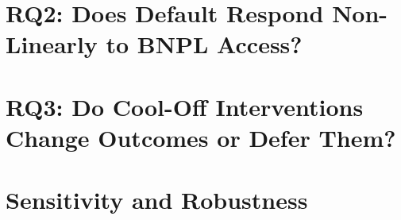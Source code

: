 \section{RQ2: Does Default Respond Non-Linearly to BNPL Access?}
\label{sec:results-rq2}


\section{RQ3: Do Cool-Off Interventions Change Outcomes or Defer Them?}
\label{sec:results-rq3}


\section{Sensitivity and Robustness}
\label{sec:results-robustness}

